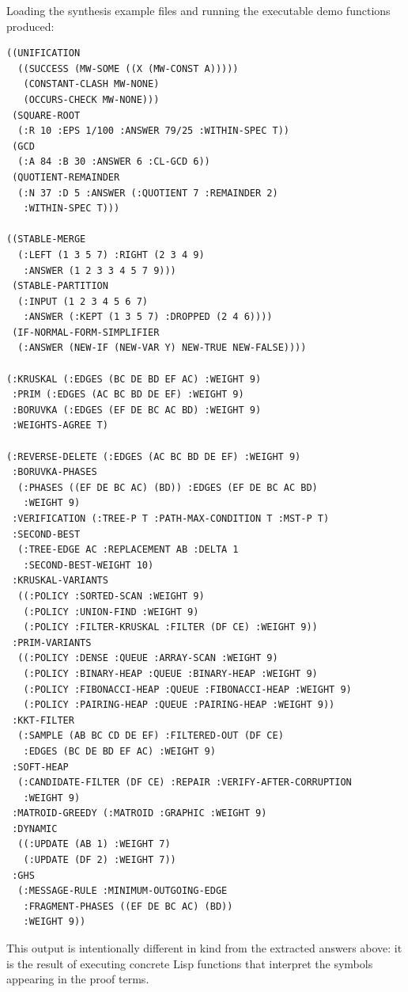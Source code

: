 \documentclass[runningheads]{llncs}
\begin{document}
Loading the synthesis example files and running the executable demo functions
produced:
\begin{lstlisting}
((UNIFICATION
  ((SUCCESS (MW-SOME ((X (MW-CONST A)))))
   (CONSTANT-CLASH MW-NONE)
   (OCCURS-CHECK MW-NONE)))
 (SQUARE-ROOT
  (:R 10 :EPS 1/100 :ANSWER 79/25 :WITHIN-SPEC T))
 (GCD
  (:A 84 :B 30 :ANSWER 6 :CL-GCD 6))
 (QUOTIENT-REMAINDER
  (:N 37 :D 5 :ANSWER (:QUOTIENT 7 :REMAINDER 2)
   :WITHIN-SPEC T)))

((STABLE-MERGE
  (:LEFT (1 3 5 7) :RIGHT (2 3 4 9)
   :ANSWER (1 2 3 3 4 5 7 9)))
 (STABLE-PARTITION
  (:INPUT (1 2 3 4 5 6 7)
   :ANSWER (:KEPT (1 3 5 7) :DROPPED (2 4 6))))
 (IF-NORMAL-FORM-SIMPLIFIER
  (:ANSWER (NEW-IF (NEW-VAR Y) NEW-TRUE NEW-FALSE))))

(:KRUSKAL (:EDGES (BC DE BD EF AC) :WEIGHT 9)
 :PRIM (:EDGES (AC BC BD DE EF) :WEIGHT 9)
 :BORUVKA (:EDGES (EF DE BC AC BD) :WEIGHT 9)
 :WEIGHTS-AGREE T)

(:REVERSE-DELETE (:EDGES (AC BC BD DE EF) :WEIGHT 9)
 :BORUVKA-PHASES
  (:PHASES ((EF DE BC AC) (BD)) :EDGES (EF DE BC AC BD)
   :WEIGHT 9)
 :VERIFICATION (:TREE-P T :PATH-MAX-CONDITION T :MST-P T)
 :SECOND-BEST
  (:TREE-EDGE AC :REPLACEMENT AB :DELTA 1
   :SECOND-BEST-WEIGHT 10)
 :KRUSKAL-VARIANTS
  ((:POLICY :SORTED-SCAN :WEIGHT 9)
   (:POLICY :UNION-FIND :WEIGHT 9)
   (:POLICY :FILTER-KRUSKAL :FILTER (DF CE) :WEIGHT 9))
 :PRIM-VARIANTS
  ((:POLICY :DENSE :QUEUE :ARRAY-SCAN :WEIGHT 9)
   (:POLICY :BINARY-HEAP :QUEUE :BINARY-HEAP :WEIGHT 9)
   (:POLICY :FIBONACCI-HEAP :QUEUE :FIBONACCI-HEAP :WEIGHT 9)
   (:POLICY :PAIRING-HEAP :QUEUE :PAIRING-HEAP :WEIGHT 9))
 :KKT-FILTER
  (:SAMPLE (AB BC CD DE EF) :FILTERED-OUT (DF CE)
   :EDGES (BC DE BD EF AC) :WEIGHT 9)
 :SOFT-HEAP
  (:CANDIDATE-FILTER (DF CE) :REPAIR :VERIFY-AFTER-CORRUPTION
   :WEIGHT 9)
 :MATROID-GREEDY (:MATROID :GRAPHIC :WEIGHT 9)
 :DYNAMIC
  ((:UPDATE (AB 1) :WEIGHT 7)
   (:UPDATE (DF 2) :WEIGHT 7))
 :GHS
  (:MESSAGE-RULE :MINIMUM-OUTGOING-EDGE
   :FRAGMENT-PHASES ((EF DE BC AC) (BD))
   :WEIGHT 9))
\end{lstlisting}
This output is intentionally different in kind from the extracted answers above:
it is the result of executing concrete Lisp functions that interpret the
symbols appearing in the proof terms.
\end{document}
